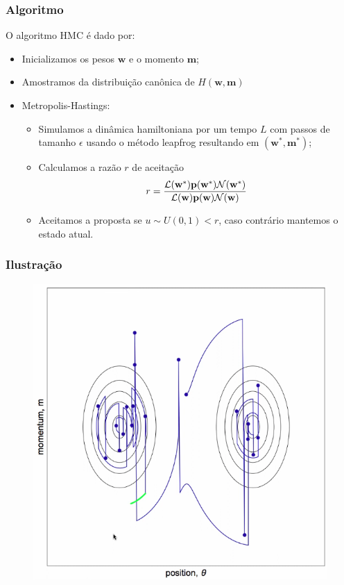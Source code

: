 \documentclass{beamer}
\begin{document}
\begin{frame}
    \frametitle{Algoritmo}

    O algoritmo HMC é dado por:
    \begin{itemize}
        \item Inicializamos os pesos $\mathbf{w}$ e o momento $\mathbf{m}$;
        \item Amostramos da distribuição canônica de $H(\mathbf{w}, \mathbf{m})$
        \item Metropolis-Hastings:
        \begin{itemize}
            \item Simulamos a dinâmica hamiltoniana por um tempo $L$ com passos de tamanho $\epsilon$ usando o método leapfrog resultando em $(\mathbf{w}^*, \mathbf{m}^*)$;
            \item Calculamos a razão $r$ de aceitação
            $$ r = \frac{\mathcal{L}(\bf{w}^*) p(\bf{w}^*) \mathcal{N}(\bf{w}^*)}{\mathcal{L}(\bf{w}) p(\bf{w}) \mathcal{N}(\bf{w})} $$
            \item Aceitamos a proposta se $u \sim U(0,1) < r$, caso contrário mantemos o estado atual.
        \end{itemize}
    \end{itemize}

\end{frame}

\begin{frame}
    \frametitle{Ilustração}

    \begin{figure}[h]
        \includegraphics[scale=0.35]{hmc.png} %
    \end{figure}

\end{frame}
\end{document}
